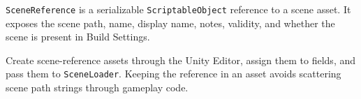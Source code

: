 \texttt{SceneReference} is a serializable \texttt{ScriptableObject} reference to a scene asset. It exposes the scene path, name, display name, notes, validity, and whether the scene is present in Build Settings.

Create scene-reference assets through the Unity Editor, assign them to fields, and pass them to \texttt{SceneLoader}. Keeping the reference in an asset avoids scattering scene path strings through gameplay code.
